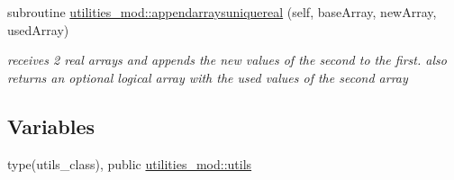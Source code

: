 \begin{DoxyCompactItemize}
subroutine \mbox{\hyperlink{namespaceutilities__mod_abffd01c3faf22f44e260c42c6f95d5c4}{utilities\+\_\+mod\+::appendarraysuniquereal}} (self, base\+Array, new\+Array, used\+Array)
\begin{DoxyCompactList}\small\item\em receives 2 real arrays and appends the new values of the second to the first. also returns an optional logical array with the used values of the second array \end{DoxyCompactList}\end{DoxyCompactItemize}
\subsection*{Variables}
\begin{DoxyCompactItemize}
\item 
type(utils\+\_\+class), public \mbox{\hyperlink{namespaceutilities__mod_aa12c2506b3107528a2511d059186f12d}{utilities\+\_\+mod\+::utils}}
\end{DoxyCompactItemize}
